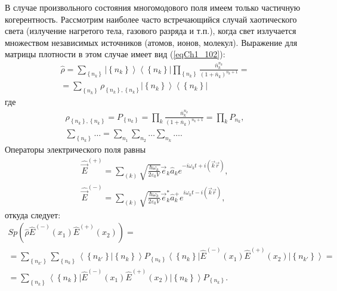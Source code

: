 В случае произвольного состояния многомодового поля имеем только
частичную когерентность. Рассмотрим наиболее часто встречающийся
случай хаотического света (излучение нагретого тела, газового разряда
и т.п.), когда свет излучается множеством независимых источников
(атомов, ионов, молекул). Выражение для матрицы плотности в этом
случае имеет вид (\ref{eqCh1_102}): 
\begin{eqnarray}
\hat{\rho} = 
\sum_{\left\{n_k\right\}} 
 \left|\left\{n_k\right\}\right>\left<\left\{n_k\right\}\right|
\prod_{\left\{n_k\right\}} 
\frac{\bar{n}_k^{n_k}}{\left(1 + \bar{n}_k\right)^{n_k+1}} =
\nonumber \\
= \sum_{\left\{n_k\right\}} \rho_{\left\{n_k\right\},
  \left\{n_k\right\}}
\left|\left\{n_k\right\}\right>\left<\left\{n_k\right\}\right|  
\label{eqCh4_18}
\end{eqnarray}
где
\begin{eqnarray}
\rho_{\left\{n_k\right\},
  \left\{n_k\right\}} =
P_{\left\{n_k\right\}} = 
\prod_k 
\frac{\bar{n}_k^{n_k}}{\left(1 + \bar{n}_k\right)^{n_k+1}} = 
\prod_k P_{n_k},
\nonumber \\
\sum_{\left\{n_k\right\}} \dots = 
\sum_{n_1} \sum_{n_2} \dots \sum_{n_k} \dots. 
\nonumber
\end{eqnarray}
Операторы электрического поля равны
\begin{eqnarray}
\hat{\vec{E}}^{(+)}= \sum_{(k)}\sqrt{\frac{\hbar \omega_k}{2
    \varepsilon_0 V}} \vec{e}_k \hat{a}_k e^{-i \omega_k t + i
    \left(\vec{k} \vec{r}\right)},
\nonumber \\
\hat{\vec{E}}^{(-)}= \sum_{(k)}\sqrt{\frac{\hbar \omega_k}{2
    \varepsilon_0 V}} \vec{e}_k^{*} \hat{a}_k^{+} e^{i \omega_k t - i
    \left(\vec{k} \vec{r}\right)},
\label{eqCh4_19}
\end{eqnarray}
откуда следует:
\begin{eqnarray}
Sp \left(
\hat{\rho}\hat{E}^{(-)}\left(x_1\right)
\hat{E}^{(+)}\left(x_2\right)
\right) = 
\nonumber \\
=\sum_{\left\{n_{k'}\right\}}\sum_{\left\{n_{k}\right\}}
\left<\left\{n_{k'}\right\}\right|\left.\left\{n_{k}\right\}\right>
P_{\left\{n_k\right\}}
\left<\left\{n_{k}\right\}\right|
\hat{E}^{(-)}\left(x_1\right)
\hat{E}^{(+)}\left(x_2\right)
\left|\left\{n_{k'}\right\}\right> =
\nonumber \\
= \sum_{\left\{n_{k}\right\}}
\left<\left\{n_{k}\right\}\right|
\hat{E}^{(-)}\left(x_1\right)
\hat{E}^{(+)}\left(x_2\right)
\left|\left\{n_{k}\right\}\right>
P_{\left\{n_k\right\}}.
\label{eqCh4_20}
\end{eqnarray}

